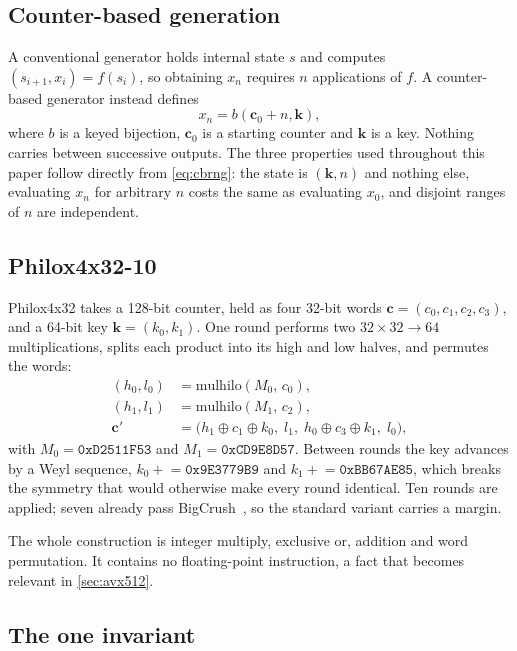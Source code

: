 \documentclass[acmsmall,screen,review]{acmart}
\theoremstyle{acmdefinition}
\newcommand{\ctr}{\mathbf{c}}
\newcommand{\key}{\mathbf{k}}
\begin{document}
\subsection{Counter-based generation}

A conventional generator holds internal state $s$ and computes
$(s_{i+1}, x_i) = f(s_i)$, so obtaining $x_n$ requires $n$ applications of $f$.
A counter-based generator instead defines
\begin{equation}\label{eq:cbrng}
  x_n = b(\ctr_0 + n, \key),
\end{equation}
where $b$ is a keyed bijection, $\ctr_0$ is a starting counter and $\key$ is a
key. Nothing carries between successive outputs. The three properties used
throughout this paper follow directly from \cref{eq:cbrng}: the state is
$(\key, n)$ and nothing else, evaluating $x_n$ for arbitrary $n$ costs the same
as evaluating $x_0$, and disjoint ranges of $n$ are independent.

\subsection{Philox4x32-10}

Philox4x32 takes a 128-bit counter, held as four 32-bit words
$\ctr = (c_0, c_1, c_2, c_3)$, and a 64-bit key $\key = (k_0, k_1)$. One round
performs two $32 \times 32 \to 64$ multiplications, splits each product into
its high and low halves, and permutes the words:
\begin{align}
  (h_0, l_0) &= \mathrm{mulhilo}(M_0,\, c_0), \label{eq:mul0}\\
  (h_1, l_1) &= \mathrm{mulhilo}(M_1,\, c_2), \label{eq:mul1}\\
  \ctr' &= \bigl(h_1 \oplus c_1 \oplus k_0,\; l_1,\;
                 h_0 \oplus c_3 \oplus k_1,\; l_0\bigr), \label{eq:round}
\end{align}
with $M_0 = \mathtt{0xD2511F53}$ and $M_1 = \mathtt{0xCD9E8D57}$. Between
rounds the key advances by a Weyl sequence,
$k_0 \mathrel{+}= \mathtt{0x9E3779B9}$ and
$k_1 \mathrel{+}= \mathtt{0xBB67AE85}$, which breaks the symmetry that would
otherwise make every round identical. Ten rounds are applied; seven already
pass BigCrush~\cite{salmon2011}, so the standard variant carries a margin.

The whole construction is integer multiply, exclusive or, addition and word
permutation. It contains no floating-point instruction, a fact that becomes
relevant in \cref{sec:avx512}.

\subsection{The one invariant}
\end{document}

